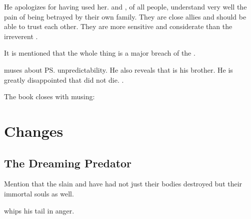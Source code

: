 \begin{garbage}
He apologizes for having used her. 
\Secherdamon{} and \Nzessuacrith, of all people, understand very well the pain of being betrayed by their own family. 
They are close allies and should be able to trust each other. 
They are more sensitive and considerate than the irreverent \Ishnaruchaefir. 

It is mentioned that the whole thing is a major breach of the \charade. 

\Secherdamon{} muses about \ps{\Ishnaruchaefir} unpredictability. 
He also reveals that \Ishnaruchaefir{} is his brother. 
He is greatly disappointed that \Ishnaruchaefir{} did not die. 
\Secherdamon{} . 

The book closes with \Secherdamon{} musing:















\section{Changes}










\subsection{The Dreaming Predator}
\begin{changes}
  \begin{comment}\paragraph{Prologue}\end{comment}
    
    Mention that the slain \dragons{} and \resphain{} have had not just their bodies destroyed but their immortal souls as well. 
    
    \Secherdamon{} whips his tail in anger. 
    

\end{changes}
\end{garbage}
